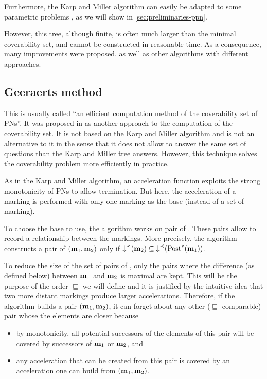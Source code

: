 Furthermore, the Karp and Miller algorithm can easily be adapted to some parametric problems \cite{David17}, as we will show in \autoref{sec:preliminaries-ppn}.

However, this tree, although finite, is often much larger than the minimal coverability set, and cannot be constructed in reasonable time.
As a consequence, many improvements were proposed, as well as other algorithms with different approaches.

\subsection{Geeraerts method}
\label{sec:eff}

This is usually called ``an efficient computation method of the coverability set of \acp{PN}''.
It was proposed in \cite{Geeraerts07thesis, Geeraerts07} as another approach to the computation of the coverability set.
It is not based on the Karp and Miller algorithm and is not an alternative to it in the sense that it does not allow to answer the same set of questions than the Karp and Miller tree answers.
However, this technique solves the coverability problem more efficiently in practice.

As in the Karp and Miller algorithm, an acceleration function exploits the strong monotonicity of \acp{PN} to allow termination.
But here, the acceleration of a marking is performed with only one marking as the base (instead of a set of marking).

To choose the base to use, the algorithm works on pair of \omarks.
These pairs allow to record a relationship between the markings.
More precisely, the algorithm constructs a pair of \omarks $(\mathbf{m}_1, \mathbf{m}_2)$ only if $\operatorname{\downarrow^\preceq}(\mathbf{m}_2) \subseteq \operatorname{\downarrow^\preceq}(\operatorname{Post}^*_{}(\mathbf{m}_1))$.

To reduce the size of the set of pairs of \omarks, only the pairs where the difference (as defined below) between $\mathbf{m}_1$ and $\mathbf{m}_2$ is maximal are kept.
This will be the purpose of the order $\sqsubseteq$ we will define and it is justified by the intuitive idea that two more distant markings produce larger accelerations.
Therefore, if the algorithm builds a pair $(\mathbf{m}_1, \mathbf{m}_2)$, it can forget about any other ($\sqsubseteq$-comparable) pair whose the elements are closer because
\begin{itemize}
  \item by monotonicity, all potential successors of the elements of this pair will be covered by successors of $\mathbf{m}_1$ or $\mathbf{m}_2$, and
  \item any acceleration that can be created from this pair is covered by an acceleration one can build from $(\mathbf{m}_1, \mathbf{m}_2)$.
\end{itemize}

